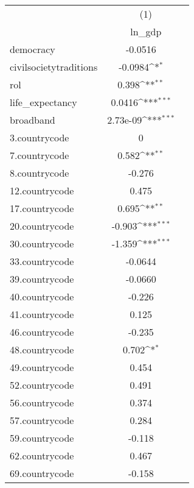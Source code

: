 {
\def\sym#1{\ifmmode^{#1}\else\(^{#1}\)\fi}
\begin{tabular}{l*{1}{cc}}
\hline\hline
            &\multicolumn{2}{c}{(1)}           \\
            &\multicolumn{2}{c}{ln\_gdp}        \\
\hline
democracy   &     -0.0516         &            \\
civilsocietytraditions&     -0.0984\sym{*}  &            \\
rol         &       0.398\sym{**} &            \\
life\_expectancy&      0.0416\sym{***}&            \\
broadband   &    2.73e-09\sym{***}&            \\
3.countrycode&           0         &            \\
7.countrycode&       0.582\sym{**} &            \\
8.countrycode&      -0.276         &            \\
12.countrycode&       0.475         &            \\
17.countrycode&       0.695\sym{**} &            \\
20.countrycode&      -0.903\sym{***}&            \\
30.countrycode&      -1.359\sym{***}&            \\
33.countrycode&     -0.0644         &            \\
39.countrycode&     -0.0660         &            \\
40.countrycode&      -0.226         &            \\
41.countrycode&       0.125         &            \\
46.countrycode&      -0.235         &            \\
48.countrycode&       0.702\sym{*}  &            \\
49.countrycode&       0.454         &            \\
52.countrycode&       0.491         &            \\
56.countrycode&       0.374         &            \\
57.countrycode&       0.284         &            \\
59.countrycode&      -0.118         &            \\
62.countrycode&       0.467         &            \\
69.countrycode&      -0.158         &            \\

\end{tabular}}

